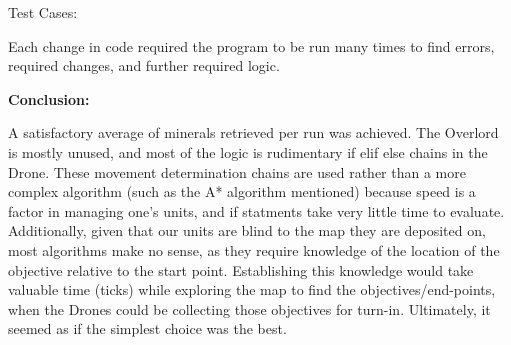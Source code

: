 \documentclass{article}
\begin{document}
    \bigskip
    Test Cases:

    Each change in code required the program to be run many times to find errors, required changes, and further required logic.
    \bigskip

    \textbf{Conclusion:}

    A satisfactory average of minerals retrieved per run was achieved.
    The Overlord is mostly unused, and most of the logic is rudimentary if elif else chains in the Drone. These movement determination chains are used rather than a more complex algorithm (such as the A* algorithm mentioned) because speed is a factor in managing one's units, and if statments take very little time to evaluate. Additionally, given that our units are blind to the map they are deposited on, most algorithms make no sense, as they require knowledge of the location of the objective relative to the start point. Establishing this knowledge would take valuable time (ticks) while exploring the map to find the objectives/end-points, when the Drones could be collecting those objectives for turn-in. Ultimately, it seemed as if the simplest choice was the best.
\end{document}
